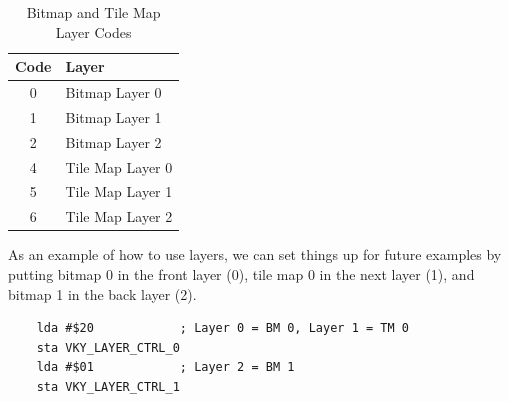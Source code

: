 \begin{table}[ht]
    \begin{center}
        \begin{tabular}{|c|l|} \hline
            Code & Layer \\ \hline\hline
            0 & Bitmap Layer 0 \\ \hline
            1 & Bitmap Layer 1 \\ \hline
            2 & Bitmap Layer 2 \\ \hline
            4 & Tile Map Layer 0 \\ \hline
            5 & Tile Map Layer 1 \\ \hline
            6 & Tile Map Layer 2 \\ \hline
        \end{tabular}
    \end{center}
    \caption{Bitmap and Tile Map Layer Codes}
    \label{tab:bm_tm_layer_codes}
\end{table}


As an example of how to use layers, we can set things up for future examples by putting bitmap 0 in the front layer (0), tile map 0 in the next layer (1), and bitmap 1 in the back layer (2).

\begin{verbatim}
    lda #$20            ; Layer 0 = BM 0, Layer 1 = TM 0
    sta VKY_LAYER_CTRL_0
    lda #$01            ; Layer 2 = BM 1
    sta VKY_LAYER_CTRL_1
\end{verbatim}
